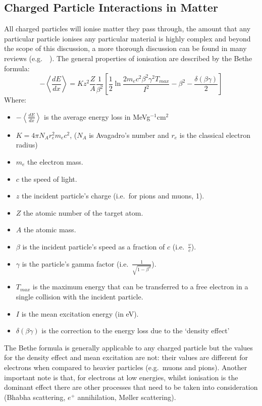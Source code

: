 \subsection{Charged Particle Interactions in Matter} %
\label{sec:charged_particle_interactions_in_matter}
All charged particles will ionise matter they pass through, the amount that any particular particle ionises any particular material is highly complex and beyond the scope of this discussion, a more thorough discussion can be found in many reviews (e.g.\ ~\cite{pdg}). The general properties of ionisation are described by the Bethe formula:
\begin{equation}\label{eq:bethe_formaula}
  -\left\langle\frac{dE}{dx}\right\rangle = Kz^2\frac{Z}{A} \frac{1}{\beta^2}\left[\frac{1}{2}\ln\frac{2m_{e}c^{2}\beta^2\gamma^2T_{max}}{I^2} -\beta^2 - \frac{\delta(\beta\gamma)}{2}\right]
\end{equation}
Where:
\begin{itemize}
  \item \( -\left\langle\frac{dE}{dx}\right\rangle \) is the average energy loss in MeVg\(^{-1}\)cm\(^2\)
  \item \( K = 4\pi N_A r^2_e m_e c^2\), (\( N_A \) is Avagadro's number and \( r_e \) is the classical electron radius) 
  \item \( m_e \) the electron mass.
  \item \( c \) the speed of light.
  \item \( z \) the incident particle's charge (i.e.\ for pions and muons, 1).
  \item \( Z \) the atomic number of the target atom.
  \item \( A \) the atomic mass.
  \item \( \beta \) is the incident particle's speed as a fraction of \( c \) (i.e.\ \( \frac{v}{c} \)).
  \item \( \gamma \) is the particle's gamma factor (i.e.\ \( \frac{1}{\sqrt{1-\beta^2}} \)).
  \item \( T_{max} \) is the maximum energy that can be transferred to a free electron in a single collision with the incident particle.
  \item \( I \) is the mean excitation energy (in eV).
  \item \( \delta(\beta\gamma) \) is the correction to the energy loss due to the `density effect'
\end{itemize}
The Bethe formula is generally applicable to any charged particle but the values for the density effect and mean excitation are not: their values are different for electrons when compared to heavier particles (e.g.\ muons and pions). Another important note is that, for electrons at low energies, whilst ionisation is the dominant effect there are other processes that need to be taken into consideration (Bhabha scattering, \(e^+\) annihilation, M\o ller scattering). 

